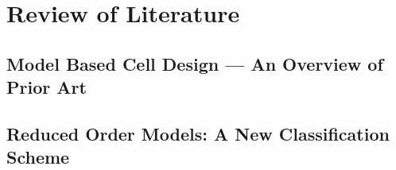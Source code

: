 

\clearpage
\chapter{Review of Literature}



\section{Model Based Cell Design --- An Overview of Prior Art}\label{sec:modelbasedliterature} 

\section{Reduced Order Models: A New Classification Scheme}\label{sec:classificationscheme}

